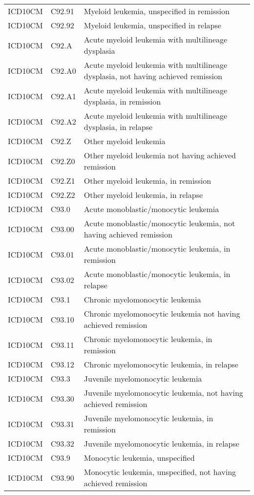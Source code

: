 \begin{longtable}{p{}p{}p{}}
  ICD10CM & C92.91 & Myeloid leukemia, unspecified in remission \\ 
  ICD10CM & C92.92 & Myeloid leukemia, unspecified in relapse \\ 
  ICD10CM & C92.A & Acute myeloid leukemia with multilineage dysplasia \\ 
  ICD10CM & C92.A0 & Acute myeloid leukemia with multilineage dysplasia, not having achieved remission \\ 
  ICD10CM & C92.A1 & Acute myeloid leukemia with multilineage dysplasia, in remission \\ 
  ICD10CM & C92.A2 & Acute myeloid leukemia with multilineage dysplasia, in relapse \\ 
  ICD10CM & C92.Z & Other myeloid leukemia \\ 
  ICD10CM & C92.Z0 & Other myeloid leukemia not having achieved remission \\ 
  ICD10CM & C92.Z1 & Other myeloid leukemia, in remission \\ 
  ICD10CM & C92.Z2 & Other myeloid leukemia, in relapse \\ 
  ICD10CM & C93.0 & Acute monoblastic/monocytic leukemia \\ 
  ICD10CM & C93.00 & Acute monoblastic/monocytic leukemia, not having achieved remission \\ 
  ICD10CM & C93.01 & Acute monoblastic/monocytic leukemia, in remission \\ 
  ICD10CM & C93.02 & Acute monoblastic/monocytic leukemia, in relapse \\ 
  ICD10CM & C93.1 & Chronic myelomonocytic leukemia \\ 
  ICD10CM & C93.10 & Chronic myelomonocytic leukemia not having achieved remission \\ 
  ICD10CM & C93.11 & Chronic myelomonocytic leukemia, in remission \\ 
  ICD10CM & C93.12 & Chronic myelomonocytic leukemia, in relapse \\ 
  ICD10CM & C93.3 & Juvenile myelomonocytic leukemia \\ 
  ICD10CM & C93.30 & Juvenile myelomonocytic leukemia, not having achieved remission \\ 
  ICD10CM & C93.31 & Juvenile myelomonocytic leukemia, in remission \\ 
  ICD10CM & C93.32 & Juvenile myelomonocytic leukemia, in relapse \\ 
  ICD10CM & C93.9 & Monocytic leukemia, unspecified \\ 
  ICD10CM & C93.90 & Monocytic leukemia, unspecified, not having achieved remission \\ 

\end{longtable}
